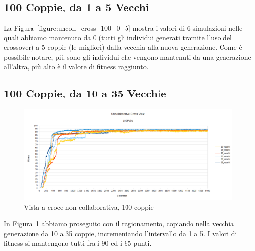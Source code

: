 \subsection{100 Coppie, da 1 a 5 Vecchi}
La Figura~\ref{figure:uncoll_cross_100_0_5} mostra i valori di 6 simulazioni
nelle quali abbiamo mantenuto da 0 (tutti gli individui generati tramite l'uso
del crossover) a 5 coppie (le migliori) dalla vecchia alla nuova generazione.
Come è possibile notare, più sono gli individui che vengono mantenuti da una
generazione all'altra, più alto è il valore di fitness raggiunto.

\subsection{100 Coppie, da 10 a 35 Vecchie}
\begin{figure}[ht]
	\centering
	\includegraphics[scale=0.7,angle=90]{imgs/uncollaborative_cross_100_pairs_10_35_vecchi.png}
	\caption{Vista a croce non collaborativa, 100 coppie}
	\label{figure:uncoll_cross_100_10_35}
\end{figure}
In Figura~\ref{figure:uncoll_cross_100_10_35} abbiamo proseguito con il
ragionamento, copiando nella vecchia generazione da 10 a 35 coppie,
incrementando l'intervallo da 1 a 5. I valori di fitness si mantengono tutti fra
i 90 ed i 95 punti.

